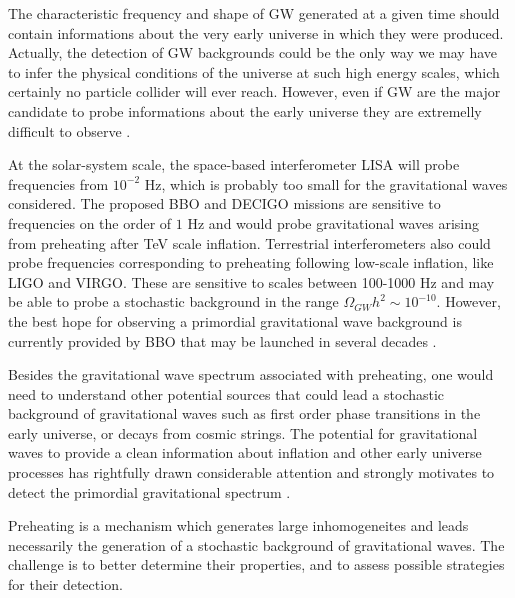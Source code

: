 \documentclass[11pt,a4paper,twoside]{book}
\begin{document}
 The characteristic frequency  and shape of GW generated at a given time should contain informations about the very early universe in which they were produced. Actually, the detection of GW backgrounds could be the only way we may have to infer the physical conditions of the universe at such high energy scales, which certainly no particle collider will ever reach. However, even if GW are the major candidate to probe informations about the early universe they are extremelly difficult to observe \cite{Chap7:HybridModel}.
 
  At the solar-system scale, the space-based interferometer LISA will probe frequencies from $ 10^{-2} $ Hz, which is probably too small for the gravitational waves considered. The proposed BBO and DECIGO missions are sensitive to frequencies on the order of $ 1 $ Hz and would probe gravitational waves arising from preheating after TeV scale inflation. Terrestrial interferometers also could probe frequencies corresponding to preheating following low-scale inflation, like LIGO and VIRGO. These are sensitive to scales between 100-1000 Hz and may be able to probe a stochastic background in the range $ \Omega_{GW}h^{2} \sim 10^{-10} $. However, the best hope for observing a primordial gravitational wave background is currently provided by BBO that may be launched in several decades \cite{Chap7:GreenMethod}.
  
  Besides the gravitational wave spectrum associated with preheating, one would need to understand other potential sources that could lead a stochastic background of gravitational waves such as first order phase transitions in the early universe, or decays from cosmic strings. The potential for gravitational waves to provide a clean information about inflation and other early universe processes has rightfully drawn considerable attention and strongly motivates to detect the primordial gravitational spectrum \cite{GWFromInflation:Intro}.
  
   Preheating is a mechanism  which generates large inhomogeneites and leads necessarily the generation of a stochastic background of gravitational waves. The challenge is to better determine their properties, and to assess possible strategies for their detection.
\end{document}
